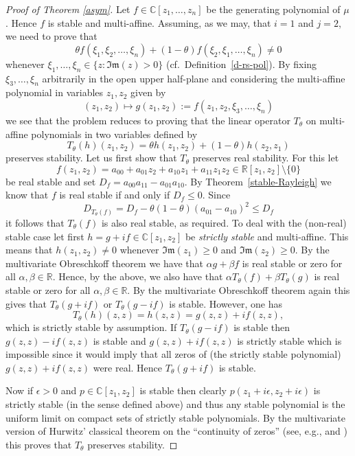 \documentclass[10pt,reqno]{amsart}
\theoremstyle{plain}
\theoremstyle{definition}
\theoremstyle{remark}
\newcommand{\RR}{\mathbb{R}}
\newcommand{\CC}{\mathbb{C}}
\renewcommand{\Im}{\mathfrak{Im}}
\begin{document}
\begin{proof}[Proof of Theorem \ref{asym}] 
Let $f \in \CC[z_1,\ldots,z_n]$ be the generating polynomial of $\mu$. 
Hence $f$ is  stable and multi-affine. 
Assuming, as we may, that $i=1$ and $j=2$, we need to prove that 
$$
\theta f(\xi_1, \xi_2, \ldots, \xi_n)+(1-\theta) 
f(\xi_2, \xi_1,\ldots, \xi_n) \neq 0
$$
whenever $\xi_1, \ldots, \xi_n \in \{z :\Im(z)> 0\}$ 
(cf.~Definition~\ref{d-rs-pol}). By fixing 
$\xi_3,\ldots,\xi_n$ arbitrarily in the open upper half-plane and considering 
the multi-affine polynomial in variables $z_1,z_2$ given by
$$(z_1,z_2)\mapsto g(z_1,z_2):= f(z_1,z_2,\xi_3, \ldots, \xi_n)$$ 
we see that the problem reduces to proving that the linear operator 
$T_\theta$ on multi-affine polynomials in two variables defined by  
$$
T_\theta(h)(z_1,z_2)=\theta h(z_1,z_2)+(1-\theta)h(z_2, z_{1}) 
$$
preserves stability. Let us first show that $T_\theta$ preserves real 
stability. For this let  
$$f(z_1,z_2) = a_{00} + a_{01}z_2 + a_{10}z_1 + a_{11}z_1z_2 \in 
\RR[z_1,z_2]\setminus \{0\}$$ 
be real stable and set $D_f=a_{00}a_{11}-a_{01}a_{10}$. By 
Theorem~\ref{stable-Rayleigh} we know that 
$f$ is real stable if and only if $D_f \leq 0$. Since 
$$
D_{T_\theta(f)} = D_f - \theta(1-\theta)(a_{01}-a_{10})^2\le D_f
$$
it follows that $T_\theta(f)$ is also real stable, as required.
To deal with the (non-real) stable case let first
$h = g +if \in \CC[z_1,z_2]$ be {\em strictly stable} and multi-affine.  
This means that 
$h(z_1,z_2)\neq 0$ whenever $\Im(z_1) \geq 0$ and $\Im(z_2) \geq 0$.  By the 
multivariate Obreschkoff theorem we have that $\alpha g + \beta f$ is real  
stable or zero for all $\alpha, \beta \in \RR$. Hence, by the above, we also 
have that $\alpha T_\theta(f) + \beta T_\theta (g)$ is real stable or zero  
for all $\alpha, \beta \in \RR$. By the  multivariate Obreschkoff theorem 
again this gives that $T_\theta(g+ if)$ or 
$T_\theta(g- if)$ is stable. However, one has 
$$T_\theta(h)(z,z)=h(z,z)=g(z,z)+if(z,z),$$ 
which is strictly stable by assumption. If $T_\theta(g - if)$ is stable then $g(z,z)-if(z,z)$ is stable and 
$g(z,z)+if(z,z)$ is strictly stable which is impossible since it would imply that all zeros of (the strictly stable polynomial)  $g(z,z)+if(z,z)$ were real. Hence   
$T_\theta(g + if)$ is stable. 

Now if $\epsilon>0$ and $p\in\CC[z_1,z_2]$ is stable then clearly 
$p(z_1+i\epsilon,z_2+i\epsilon)$ is strictly stable (in the sense defined 
above) and thus any stable polynomial is the uniform limit on compact sets 
of strictly stable polynomials. By the multivariate version of 
Hurwitz' classical theorem on the ``continuity of zeros'' 
(see, e.g., \cite[Theorem 2.3]{BBS1} and \cite[Footnote 3, p.~96]{COSW}) 
this proves that $T_\theta$ preserves stability. 
\end{proof}
\end{document}
